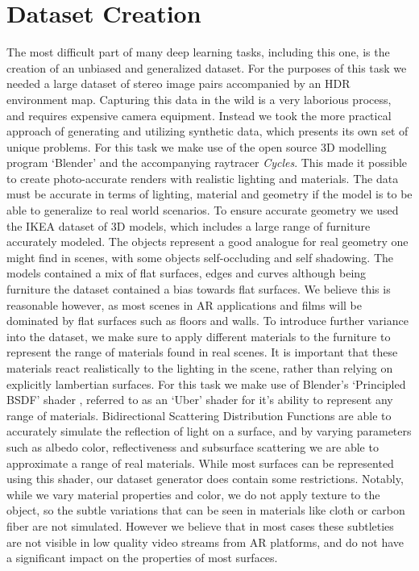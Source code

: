 \documentclass[ %
                    author={Gavin Parker},
                supervisor={Dr. Neill Campbell},
                    degree={MEng},
                     title={Deep Learning for Illumination Estimation from Stereo Images},
                  subtitle={},
                      type={Research},
                      year={2018} ]{dissertation}
\begin{document}
\section{Dataset Creation}
The most difficult part of many deep learning tasks, including this one, is the creation of an unbiased and generalized dataset. For the purposes of this task we needed a large dataset of stereo image pairs accompanied by an HDR environment map. Capturing this data in the wild is a very laborious process, and requires expensive camera equipment. Instead we took the more practical approach of generating and utilizing synthetic data, which presents its own set of unique problems. For this task we make use of the open source 3D modelling program `Blender' and the accompanying raytracer \textit{Cycles}. This made it possible to create photo-accurate renders with realistic lighting and materials. The data must be accurate in terms of lighting, material and geometry if the model is to be able to generalize to real world scenarios. To ensure accurate geometry we used the IKEA dataset \cite{lpt2013ikea} of 3D models, which includes a large range of furniture accurately modeled. The objects represent a good analogue for real geometry one might find in scenes, with some objects self-occluding and self shadowing. The models contained a mix of flat surfaces, edges and curves although being furniture the dataset contained a bias towards flat surfaces. We believe this is reasonable however, as most scenes in AR applications and films will be dominated by flat surfaces such as floors and walls.
\newline
To introduce further variance into the dataset, we make sure to apply different materials to the furniture to represent the range of materials found in real scenes. It is important that these materials react realistically to the lighting in the scene, rather than relying on explicitly lambertian surfaces. For this task we make use of Blender's `Principled BSDF' shader \cite{principled_BSDF}, referred to as an `Uber' shader for it's ability to represent any range of materials. Bidirectional Scattering Distribution Functions are able to accurately simulate the reflection of light on a surface, and by varying parameters such as albedo color, reflectiveness and subsurface scattering we are able to approximate a range of real materials. While most surfaces can be represented using this shader, our dataset generator does contain some restrictions. Notably, while we vary material properties and color, we do not apply texture to the object, so the subtle variations that can be seen in materials like cloth or carbon fiber are not simulated. However we believe that in most cases these subtleties are not visible in low quality video streams from AR platforms, and do not have a significant impact on the properties of most surfaces.
\end{document}
